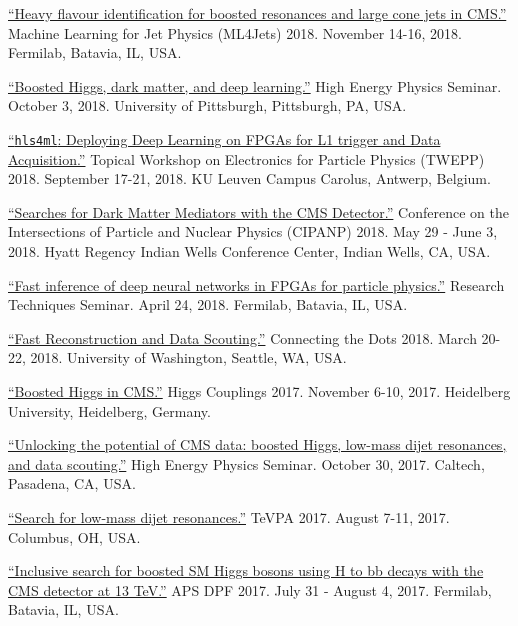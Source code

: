 \documentclass[11pt]{res}
\begin{document}
\begin{resume}
\href{https://indico.cern.ch/event/745718/contributions/3211982/}{``Heavy
  flavour identification for boosted resonances and large cone jets in
  CMS.''} Machine Learning for Jet Physics (ML4Jets) 2018. November
14-16, 2018. Fermilab, Batavia, IL, USA.

\href{https://www.physicsandastronomy.pitt.edu/events/hep-seminar-javier-duarte-fermilab}{``Boosted
    Higgs, dark matter, and deep learning.''} High Energy Physics
  Seminar. October 3, 2018. University of Pittsburgh, Pittsburgh, PA, USA.

\href{https://indico.cern.ch/event/697988/contributions/3055990/}{``\texttt{hls4ml}:
    Deploying Deep Learning on FPGAs for L1 trigger and Data
    Acquisition.''} Topical Workshop on Electronics for
  Particle Physics (TWEPP) 2018. September 17-21, 2018. KU Leuven Campus Carolus, Antwerp, Belgium.

\href{https://conferences.lbl.gov/event/137/session/27/contribution/354}{``Searches
    for Dark Matter Mediators with the CMS Detector.''} Conference on the Intersections of Particle and Nuclear
  Physics (CIPANP) 2018. May 29 - June 3, 2018. Hyatt Regency Indian Wells
  Conference Center, Indian Wells, CA, USA.

\href{https://indico.fnal.gov/event/16908/}{``Fast inference of deep neural networks in FPGAs for particle physics.''} Research Techniques Seminar. April 24, 2018. Fermilab, Batavia, IL, USA.

\href{https://indico.cern.ch/event/658267/contributions/2881127/}{``Fast Reconstruction and Data Scouting.''} Connecting the Dots 2018. March 20-22,
  2018. University of Washington, Seattle, WA, USA.

\href{http://www.thphys.uni-heidelberg.de/~higgs/talks/duarte.pdf}{``Boosted Higgs in CMS.''} Higgs Couplings 2017. November 6-10, 2017. Heidelberg
  University, Heidelberg, Germany.

\href{https://indico.hep.caltech.edu/indico/conferenceDisplay.py?confId=149}{``Unlocking the potential of CMS data: boosted Higgs, low-mass dijet resonances, and data scouting.''} High Energy Physics Seminar. October 30, 2017. Caltech, Pasadena, CA, USA.

\href{https://indico.cern.ch/event/615891/contributions/2666361/}{``Search
    for low-mass dijet resonances.''} TeVPA 2017. August 7-11,
  2017. Columbus, OH, USA.

\href{https://indico.fnal.gov/contributionDisplay.py?sessionId=14&contribId=38&confId=11999}{``Inclusive
  search for boosted SM Higgs bosons using H to bb decays with the CMS
  detector at 13 TeV.''} APS DPF 2017.  July
  31 - August 4, 2017. Fermilab, Batavia, IL, USA.


\end{resume}
\end{document}
